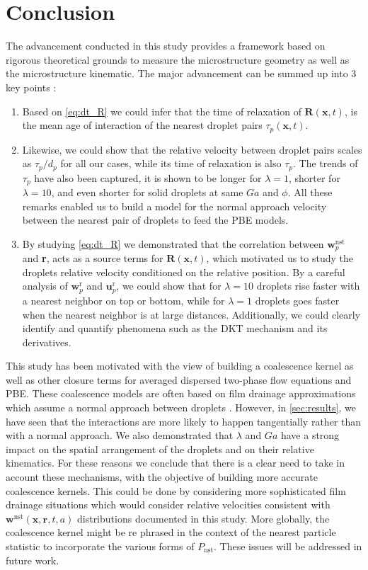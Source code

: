 \section{Conclusion}

The advancement conducted in this study provides a framework based on rigorous theoretical grounds to measure the microstructure geometry as well as the microstructure kinematic.
The major advancement can be summed up into 3 key points :
\begin{enumerate}
    \item Based on \ref{eq:dt_R} we could infer that the time of relaxation of $\textbf{R}(\textbf{x},t)$, is the mean age of interaction of the  nearest droplet pairs $\tau_p(\textbf{x},t)$. 
    \item Likewise, we could show that the relative velocity between droplet pairs scales as $\tau_p /d_p$ for all our cases, while its time of relaxation is also $\tau_p$. 
    The trends of $\tau_p$ have also been captured, it is shown to be longer for $\lambda = 1$, shorter for $\lambda = 10$, and even shorter for solid droplets at same $Ga$ and $\phi$. 
    All these remarks enabled us to build a model for the normal approach velocity between the nearest pair of droplets to feed the PBE models. 
    \item By studying \ref{eq:dt_R} we demonstrated that the correlation between $\textbf{w}_p^\text{nst}$ and \textbf{r}, acts as a source terms for $\textbf{R}(\textbf{x},t)$, which motivated us to study the droplets relative velocity conditioned on the relative position. 
    By a careful analysis of $\textbf{w}_p^\text{r}$ and $\textbf{u}_p^\text{r}$, we could show that for $\lambda = 10$ droplets rise faster with a nearest neighbor on top or bottom, while for $\lambda = 1$ droplets goes faster when the nearest neighbor is at large distances.
    Additionally, we could clearly identify and quantify phenomena such as the DKT mechanism and its derivatives. 
\end{enumerate}

This study has been motivated with the view of building a coalescence kernel as well as other closure terms for averaged dispersed two-phase flow equations and PBE. 
These coalescence models are often based on film drainage approximations which assume a normal approach between droplets \citet{chesters1991modelling}.  
However, in \ref{sec:results}, we have seen that the interactions are more likely to happen tangentially rather than with a normal approach. 
We also demonstrated that $\lambda$ and $Ga$ have a strong impact on the spatial arrangement of the droplets and on their relative kinematics. 
For these reasons we conclude that there is a clear need to take in account these mechanisms, with the objective of building more accurate coalescence kernels. 
This could be done by considering more sophisticated film drainage situations which would consider relative velocities consistent with $\textbf{w}^\text{nst}(\textbf{x},\textbf{r},t,a)$ distributions documented in this study.
More globally, the coalescence kernel might be re phrased in the context of the nearest particle statistic to incorporate the various forms of $P_\text{nst}$. 
These issues will be addressed in future work.  


